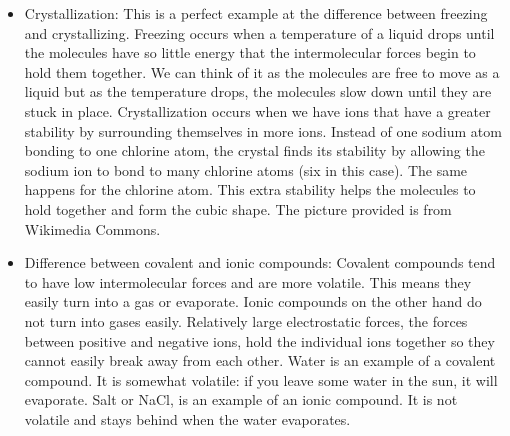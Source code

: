 \begin{itemize}
{\begin{itemize}
\begin{itemize}
{\begin{itemize}
\item{Crystallization: This is a perfect example at the difference between freezing and crystallizing. Freezing occurs when a temperature of a liquid drops until the molecules have so little energy that the intermolecular forces begin to hold them together. We can think of it as the molecules are free to move as a liquid but as the temperature drops, the molecules slow down until they are stuck in place. Crystallization occurs when we have ions that have a greater stability by surrounding themselves in more ions. Instead of one sodium atom bonding to one chlorine atom, the crystal finds its stability by allowing the sodium ion to bond to many chlorine atoms (six in this case). The same happens for the chlorine atom. This extra stability helps the molecules to hold together and form the cubic shape. The picture provided is from Wikimedia Commons.}
\item{Difference between covalent and ionic compounds: Covalent compounds tend to have low intermolecular forces and are more volatile. This means they easily turn into a gas or evaporate. Ionic compounds on the other hand do not turn into gases easily. Relatively large electrostatic forces, the forces between positive and negative ions, hold the individual ions together so they cannot easily break away from each other. Water is an example of a covalent compound. It is somewhat volatile: if you leave some water in the sun, it will evaporate. Salt or NaCl, is an example of an ionic compound. It is not volatile and stays behind when the water evaporates.}
\end{itemize}
}
\end{itemize}


\end{itemize}}
\end{itemize}
